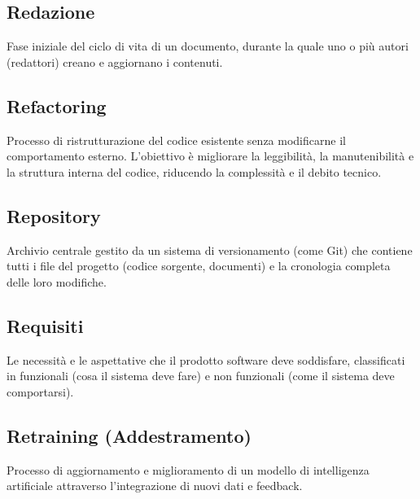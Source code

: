 \documentclass[a4paper, 11pt, oneside]{scrartcl} %
\begin{document}
\vspace{0.5cm}

\subsection*{Redazione}


Fase iniziale del ciclo di vita di un documento, durante la quale uno o più autori (redattori) creano e aggiornano i contenuti.

\vspace{0.5cm}

\subsection*{Refactoring}
Processo di ristrutturazione del codice esistente senza modificarne il comportamento esterno. L'obiettivo è migliorare la leggibilità, la manutenibilità e la struttura interna del codice, riducendo la complessità e il debito tecnico.
\vspace{0.5cm}

\subsection*{Repository}


Archivio centrale gestito da un sistema di versionamento (come Git) che contiene tutti i file del progetto (codice sorgente, documenti) e la cronologia completa delle loro modifiche.

\vspace{0.5cm}

\subsection*{Requisiti}


Le necessità e le aspettative che il prodotto software deve soddisfare, classificati in funzionali (cosa il sistema deve fare) e non funzionali (come il sistema deve comportarsi).

\vspace{0.5cm}

\subsection*{Retraining (Addestramento)}
Processo di aggiornamento e miglioramento di un modello di intelligenza artificiale attraverso l'integrazione di nuovi dati e feedback.
\vspace{0.5cm}
\end{document}
